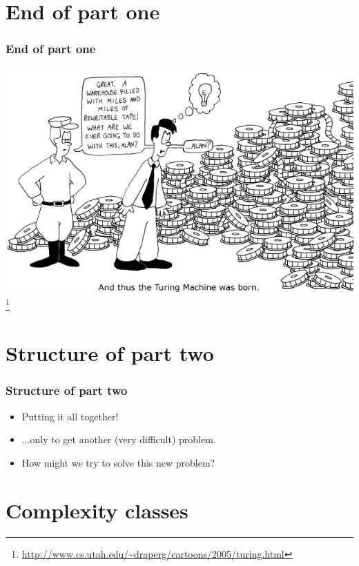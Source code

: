 \documentclass[aspectratio=169]{beamer}
\begin{document}
\section{End of part one}

\begin{frame}
\frametitle{End of part one}
\begin{center}
\includegraphics{turing_comic}\footnote{\url{http://www.cs.utah.edu/~draperg/cartoons/2005/turing.html}}
\end{center}
\end{frame}

\section{Structure of part two}

\begin{frame}
\frametitle{Structure of part two}
\begin{itemize}
    \item Putting it all together!
    \item ...only to get another (very difficult) problem.
    \item How might we try to solve this new problem?
\end{itemize}
\end{frame}

\section{Complexity classes}
\end{document}

